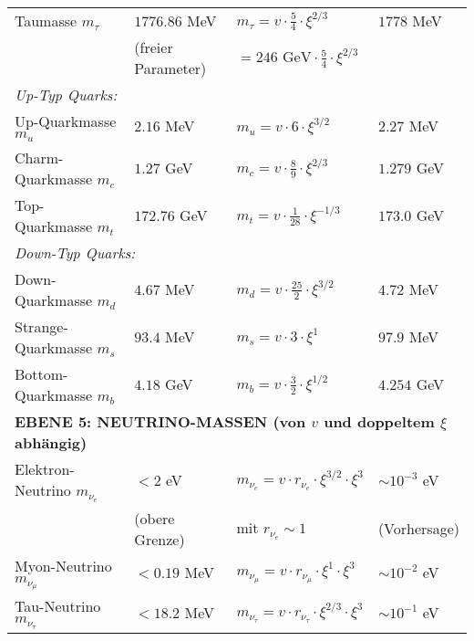 \documentclass[12pt,a4paper]{article}
\theoremstyle{definition}
\begin{document}
\begin{longtable}{p{5cm}p{4cm}p{3.5cm}p{3.5cm}}
	Taumasse $m_\tau$ & $1776.86$ MeV & $m_\tau = v \cdot \frac{5}{4} \cdot \xi^{2/3}$ & $1778$ MeV \\
	& (freier Parameter) & $= 246 \text{ GeV} \cdot \frac{5}{4} \cdot \xi^{2/3}$ & \\[0.3em]
	
	\multicolumn{4}{l}{\textit{Up-Typ Quarks:}} \\
	
	Up-Quarkmasse $m_u$ & $2.16$ MeV & $m_u = v \cdot 6 \cdot \xi^{3/2}$ & $2.27$ MeV \\
	
	Charm-Quarkmasse $m_c$ & $1.27$ GeV & $m_c = v \cdot \frac{8}{9} \cdot \xi^{2/3}$ & $1.279$ GeV \\
	
	Top-Quarkmasse $m_t$ & $172.76$ GeV & $m_t = v \cdot \frac{1}{28} \cdot \xi^{-1/3}$ & $173.0$ GeV \\
	
	\multicolumn{4}{l}{\textit{Down-Typ Quarks:}} \\
	
	Down-Quarkmasse $m_d$ & $4.67$ MeV & $m_d = v \cdot \frac{25}{2} \cdot \xi^{3/2}$ & $4.72$ MeV \\
	
	Strange-Quarkmasse $m_s$ & $93.4$ MeV & $m_s = v \cdot 3 \cdot \xi^1$ & $97.9$ MeV \\
	
	Bottom-Quarkmasse $m_b$ & $4.18$ GeV & $m_b = v \cdot \frac{3}{2} \cdot \xi^{1/2}$ & $4.254$ GeV \\
	
	\midrule
	\multicolumn{4}{l}{\textbf{EBENE 5: NEUTRINO-MASSEN (von $v$ und doppeltem $\xi$ abhängig)}} \\
	\midrule
	
	Elektron-Neutrino $m_{\nu_e}$ & $< 2$ eV & $m_{\nu_e} = v \cdot r_{\nu_e} \cdot \xi^{3/2} \cdot \xi^3$ & $\sim 10^{-3}$ eV \\
	& (obere Grenze) & mit $r_{\nu_e} \sim 1$ & (Vorhersage) \\[0.3em]
	
	Myon-Neutrino $m_{\nu_\mu}$ & $< 0.19$ MeV & $m_{\nu_\mu} = v \cdot r_{\nu_\mu} \cdot \xi^{1} \cdot \xi^3$ & $\sim 10^{-2}$ eV \\
	
	Tau-Neutrino $m_{\nu_\tau}$ & $< 18.2$ MeV & $m_{\nu_\tau} = v \cdot r_{\nu_\tau} \cdot \xi^{2/3} \cdot \xi^3$ & $\sim 10^{-1}$ eV \\
	

\end{longtable}
\end{document}
